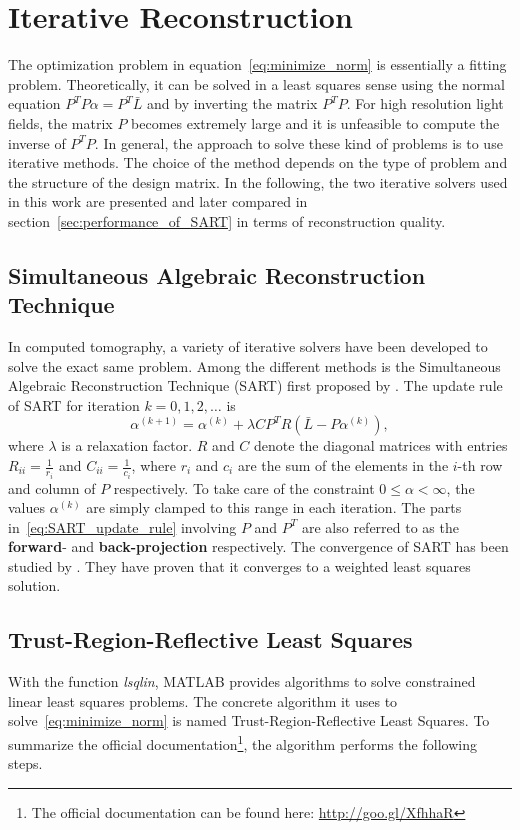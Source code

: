 \section{Iterative Reconstruction}
\label{sec:iterative_reconstruction}

The optimization problem in equation~\ref{eq:minimize_norm} is essentially a fitting problem.
Theoretically, it can be solved in a least squares sense using the normal equation $P^T P \alpha = P^T \bar{L}$ and by inverting the matrix $P^T P$.
For high resolution light fields, the matrix $P$ becomes extremely large and it is unfeasible to compute the inverse of $P^T P$.
In general, the approach to solve these kind of problems is to use iterative methods.
The choice of the method depends on the type of problem and the structure of the design matrix.
In the following, the two iterative solvers used in this work are presented and later compared in section~\ref{sec:performance_of_SART} in terms of reconstruction quality.

\subsection*{Simultaneous Algebraic Reconstruction Technique}
In computed tomography, a variety of iterative solvers have been developed to solve the exact same problem. 
Among the different methods is the Simultaneous Algebraic Reconstruction Technique (\mbox{SART}) first proposed by \cite{SART}.
The update rule of \mbox{SART} for iteration $k = 0, 1, 2, \dots$ is
\begin{equation}\label{eq:SART_update_rule}
	\alpha^{(k + 1)} = \alpha^{(k)} + \lambda C P^T R \left( \bar{L} - P \alpha^{(k)} \right), 	
\end{equation}
where $\lambda$ is a relaxation factor.
$R$ and $C$ denote the diagonal matrices with entries $R_{ii} = \frac{1}{r_i}$ and $C_{ii} = \frac{1}{c_i}$, where $r_i$ and $c_i$ are the sum of the elements in the \mbox{$i$-th} row and column of $P$ respectively.
To take care of the constraint $0 \leq \alpha < \infty$, the values $\alpha^{(k)}$ are simply clamped to this range in each iteration.
The parts in~\ref{eq:SART_update_rule} involving $P$ and $P^T$ are also referred to as the \textbf{forward}- and \textbf{back-projection} respectively.
The convergence of \mbox{SART} has been studied by \cite{ConvergenceSART2}.
They have proven that it converges to a weighted least squares solution.

\subsection*{Trust-Region-Reflective Least Squares}
With the function \emph{lsqlin}, \mbox{MATLAB} provides algorithms to solve constrained linear least squares problems. 
The concrete algorithm it uses to solve~\ref{eq:minimize_norm} is named Trust-Region-Reflective Least Squares.
To summarize the official documentation\footnote{The official documentation can be found here: \url{http://goo.gl/XfhhaR}}, 
the algorithm performs the following steps.

